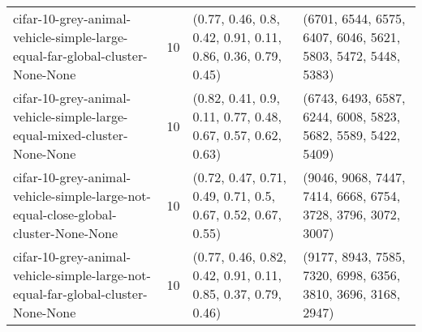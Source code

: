 \begin{longtable}{llll}
                                 cifar-10-grey-animal-vehicle-simple-large-equal-far-global-cluster-None-None &             10 &                                                                                                                                                                                                                                               (0.77, 0.46, 0.8, 0.42, 0.91, 0.11, 0.86, 0.36, 0.79, 0.45) &                                                                                                                                                                                                                                              (6701, 6544, 6575, 6407, 6046, 5621, 5803, 5472, 5448, 5383) \\
                                      cifar-10-grey-animal-vehicle-simple-large-equal-mixed-cluster-None-None &             10 &                                                                                                                                                                                                                                               (0.82, 0.41, 0.9, 0.11, 0.77, 0.48, 0.67, 0.57, 0.62, 0.63) &                                                                                                                                                                                                                                              (6743, 6493, 6587, 6244, 6008, 5823, 5682, 5589, 5422, 5409) \\
                           cifar-10-grey-animal-vehicle-simple-large-not-equal-close-global-cluster-None-None &             10 &                                                                                                                                                                                                                                               (0.72, 0.47, 0.71, 0.49, 0.71, 0.5, 0.67, 0.52, 0.67, 0.55) &                                                                                                                                                                                                                                              (9046, 9068, 7447, 7414, 6668, 6754, 3728, 3796, 3072, 3007) \\
                             cifar-10-grey-animal-vehicle-simple-large-not-equal-far-global-cluster-None-None &             10 &                                                                                                                                                                                                                                              (0.77, 0.46, 0.82, 0.42, 0.91, 0.11, 0.85, 0.37, 0.79, 0.46) &                                                                                                                                                                                                                                              (9177, 8943, 7585, 7320, 6998, 6356, 3810, 3696, 3168, 2947) \\

\end{longtable}
